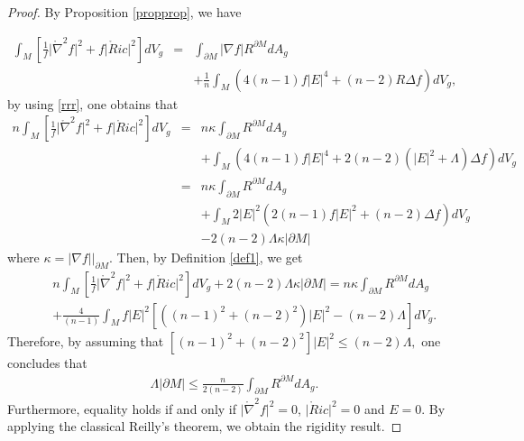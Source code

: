 \documentclass{amsart}
\numberwithin{equation}{section}
\begin{document}
		
\begin{proof}
By Proposition \ref{propprop}, we have 

		\begin{eqnarray*}
			\int_{M}\left[\frac{1}{f}\vert\mathring{\nabla}^2f\vert^{2} + f\vert\mathring{R}ic\vert^{2}\right] dV_{g}	&=&	\int_{\partial M}\vert\nabla f\vert R^{\partial M} dA_{g} \nonumber\\
			&&+ \frac{1}{n}\int_{M}\left(4(n-1)f\vert E\vert^{4}+(n-2)R\Delta f\right) dV_{g},
		\end{eqnarray*} by using \eqref{rrr}, one obtains that
		\begin{eqnarray*}
			n\int_{M}\left[\frac{1}{f}\vert\mathring{\nabla}^2f\vert^{2} + f\vert\mathring{R}ic\vert^{2}\right]dV_{g}	&=&	n\kappa\int_{\partial M} R^{\partial M} dA_{g} \nonumber\\
			&&+\int_{M}\left(4(n-1)f\vert E\vert^{4}+2(n-2)(\vert E\vert^2 + \Lambda)\Delta f\right) dV_{g}\nonumber\\
			&=&	n\kappa\int_{\partial M} R^{\partial M} dA_{g} \nonumber\\
			&&+\int_{M}2\vert E\vert^{2}\left( 2(n-1)f\vert E\vert^{2}+(n-2)\Delta f\right) dV_{g} \nonumber\\
			&&- 2(n-2)\Lambda\kappa\vert\partial M\vert
		\end{eqnarray*}
		where $\kappa = \vert\nabla f\vert\Big|_{\partial M}$. Then, by Definition \ref{def1}, we get
		\begin{eqnarray*}
			&&	n\int_{M}\left[\frac{1}{f}\vert\mathring{\nabla}^2f\vert^{2} + f\vert\mathring{R}ic\vert^{2}\right]dV_{g}
			+  2(n-2)\Lambda\kappa\vert\partial M\vert=	n\kappa\int_{\partial M} R^{\partial M} dA_{g} \nonumber\\
			&&+\frac{4}{(n-1)}\int_{M}f\vert E\vert^{2}\left[((n-1)^{2}+(n-2)^{2})\vert E\vert^{2}  - 
			(n-2)\Lambda\right]dV_{g}.
		\end{eqnarray*} Therefore, by assuming that $[(n-1)^2+(n-2)^2]\vert E\vert^{2}\leq (n-2)\Lambda,$ one concludes that
		\begin{eqnarray*}
			\Lambda\vert\partial M\vert\leq \frac{n}{2(n-2)}\int_{\partial M} R^{\partial M} dA_{g}.
		\end{eqnarray*} Furthermore, equality holds if and only if $\vert\mathring{\nabla}^2f\vert^{2}=0$, $\vert\mathring{R}ic\vert^{2}=0$ and $E=0$. By applying the classical Reilly's theorem, we obtain the rigidity result.
	\end{proof}
	
	
	
\end{document}
